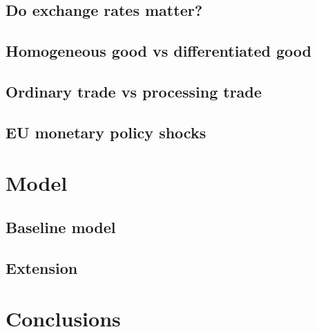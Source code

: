 \subsection{Do exchange rates matter?}

\subsection{Homogeneous good vs differentiated good}

\subsection{Ordinary trade vs processing trade}

\subsection{EU monetary policy shocks}

\section{Model}

\subsection{Baseline model}

\subsection{Extension}

\section{Conclusions}

